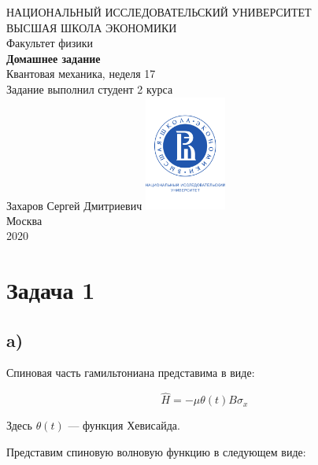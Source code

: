 \documentclass[a4paper, 12pt]{article}
\begin{document}
	\begin{titlepage}
		\begin{center}
			$$$$
			$$$$
			$$$$
			$$$$
			{\Large{НАЦИОНАЛЬНЫЙ ИССЛЕДОВАТЕЛЬСКИЙ УНИВЕРСИТЕТ}}\\
			\vspace{0.1cm}
			{\Large{ВЫСШАЯ ШКОЛА ЭКОНОМИКИ}}\\
			\vspace{0.25cm}
			{\large{Факультет физики}}\\
			\vspace{5.5cm}
			{\Huge\textbf{{Домашнее задание}}}\\%
			\vspace{1cm}
			{\LARGE{Квантовая механика, неделя 17}}\\%
			\vspace{2cm}
			{Задание выполнил студент 2 курса}\\
			{Захаров Сергей Дмитриевич}
			\vfill
			\includegraphics[width = 0.2\textwidth]{HSElogo}\\
			\vfill
			Москва\\
			2020
		\end{center}
	\end{titlepage}

\section*{Задача 1}

\subsection*{a)}

Спиновая часть гамильтониана представима в виде:

\begin{equation*}
	\hat{H} = - \mu \theta(t) B \hat{\sigma}_x
\end{equation*}

Здесь $\theta(t)$ --- функция Хевисайда.

Представим спиновую волновую функцию в следующем виде:
\end{document}
